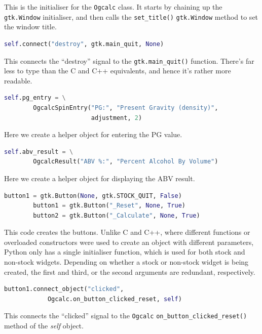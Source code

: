 \documentclass[a4paper,oneside]{article}
\newcommand{\variable}[1]{\textsl{#1}}
\newcommand{\class}[1]{\texttt{#1}}
\newcommand{\function}[1]{\texttt{#1()}}
\begin{document}
This is the initialiser for the \class{Ogcalc} class.  It starts by
chaining up the \class{gtk.Window} initialiser, and then calls the
\function{set\_title} \class{gtk.Window} method to set the window
title.

\begin{lstlisting}[numbers=none, language=Python]
        self.connect("destroy", gtk.main_quit, None)
\end{lstlisting}

This connects the ``destroy'' signal to the \function{gtk.main\_quit}
function.  There's far less to type than the C and C++ equivalents,
and hence it's rather more readable.

\begin{lstlisting}[numbers=none, language=Python]
        self.pg_entry = \
        OgcalcSpinEntry("PG:", "Present Gravity (density)",
                        adjustment, 2)
\end{lstlisting}

Here we create a helper object for entering the PG value.

\begin{lstlisting}[numbers=none, language=Python]
        self.abv_result = \
        OgcalcResult("ABV %:", "Percent Alcohol By Volume")
\end{lstlisting}

Here we create a helper object for displaying the ABV result.

\begin{lstlisting}[numbers=none, language=Python]
        button1 = gtk.Button(None, gtk.STOCK_QUIT, False)
        button1 = gtk.Button("_Reset", None, True)
        button2 = gtk.Button("_Calculate", None, True)
\end{lstlisting}

This code creates the buttons.  Unlike C and C++, where different
functions or overloaded constructors were used to create an object
with different parameters, Python only has a single initialiser
function, which is used for both stock and non-stock widgets.
Depending on whether a stock or non-stock widget is being created, the
first and third, or the second arguments are redundant, respectively.

\begin{lstlisting}[numbers=none, language=Python]
        button1.connect_object("clicked",
            Ogcalc.on_button_clicked_reset, self)
\end{lstlisting}

This connects the ``clicked'' signal to the \class{Ogcalc}
\function{on\_button\_clicked\_reset} method of the \variable{self}
object.
\end{document}
